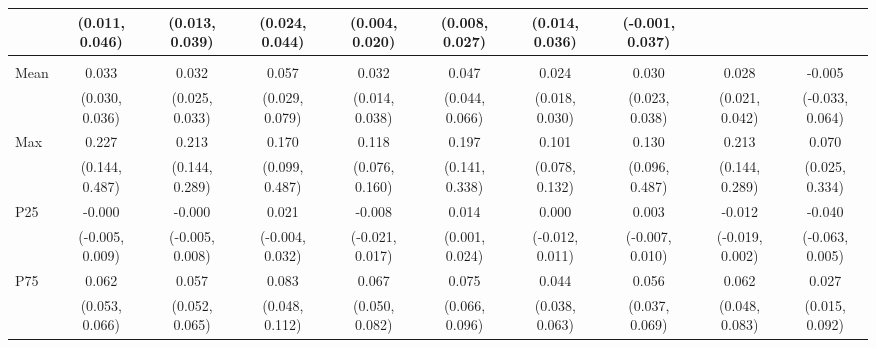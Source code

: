 {\begin{tabular}{l|c|c|c|c|c|c|c|c|c}
& {\scriptsize (0.011, 0.046)}
& {\scriptsize (0.013, 0.039)}
& {\scriptsize (0.024, 0.044)}
& {\scriptsize (0.004, 0.020)}
& {\scriptsize (0.008, 0.027)}
& {\scriptsize (0.014, 0.036)}
& {\scriptsize (-0.001, 0.037)}
\\ [0.1cm]
\hline
\noalign{\smallskip}
\multicolumn{10}{l}{\textbf{Effect with Leads and Lags}} \\
\noalign{\smallskip}
\hline
Mean
& 0.033 & 0.032 & 0.057 & 0.032 & 0.047 & 0.024 & 0.030 & 0.028 & -0.005 \\
& {\scriptsize (0.030, 0.036)}
& {\scriptsize (0.025, 0.033)}
& {\scriptsize (0.029, 0.079)}
& {\scriptsize (0.014, 0.038)}
& {\scriptsize (0.044, 0.066)}
& {\scriptsize (0.018, 0.030)}
& {\scriptsize (0.023, 0.038)}
& {\scriptsize (0.021, 0.042)}
& {\scriptsize (-0.033, 0.064)}
\\ [0.1cm]
\hline
Max
& 0.227 & 0.213 & 0.170 & 0.118 & 0.197 & 0.101 & 0.130 & 0.213 & 0.070 \\
& {\scriptsize (0.144, 0.487)}
& {\scriptsize (0.144, 0.289)}
& {\scriptsize (0.099, 0.487)}
& {\scriptsize (0.076, 0.160)}
& {\scriptsize (0.141, 0.338)}
& {\scriptsize (0.078, 0.132)}
& {\scriptsize (0.096, 0.487)}
& {\scriptsize (0.144, 0.289)}
& {\scriptsize (0.025, 0.334)}
\\ [0.1cm]
\hline
P25
& -0.000 & -0.000 & 0.021 & -0.008 & 0.014 & 0.000 & 0.003 & -0.012 & -0.040 \\
& {\scriptsize (-0.005, 0.009)}
& {\scriptsize (-0.005, 0.008)}
& {\scriptsize (-0.004, 0.032)}
& {\scriptsize (-0.021, 0.017)}
& {\scriptsize (0.001, 0.024)}
& {\scriptsize (-0.012, 0.011)}
& {\scriptsize (-0.007, 0.010)}
& {\scriptsize (-0.019, 0.002)}
& {\scriptsize (-0.063, 0.005)}
\\ [0.1cm]
\hline
P75
& 0.062 & 0.057 & 0.083 & 0.067 & 0.075 & 0.044 & 0.056 & 0.062 & 0.027 \\
& {\scriptsize (0.053, 0.066)}
& {\scriptsize (0.052, 0.065)}
& {\scriptsize (0.048, 0.112)}
& {\scriptsize (0.050, 0.082)}
& {\scriptsize (0.066, 0.096)}
& {\scriptsize (0.038, 0.063)}
& {\scriptsize (0.037, 0.069)}
& {\scriptsize (0.048, 0.083)}
& {\scriptsize (0.015, 0.092)}
\\ [0.1cm]
\hline
\hline
\end{tabular}
}
